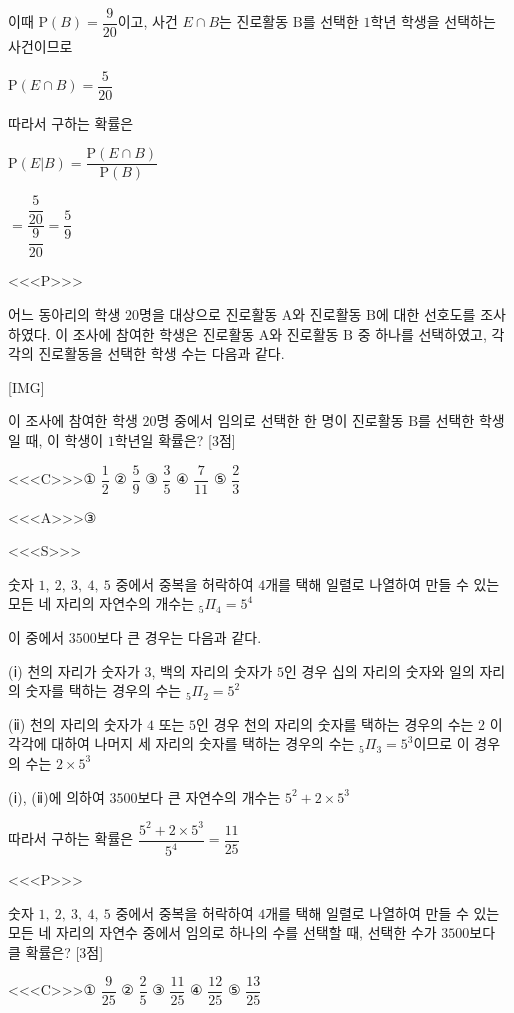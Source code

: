 \documentclass{oblivoir}
\begin{document}
이때 $\mathrm{P}(B)=\dfrac{9}{20}$이고, 사건 $E\cap B$는 진로활동 $\mathrm{B}$를 선택한 $1$학년 학생을 선택하는 사건이므로

$\mathrm{P}(E\cap B)=\dfrac{5}{20}$

따라서 구하는 확률은

$\mathrm{P}(E | B)$$=\dfrac{\mathrm{P}(E\cap B)}{\mathrm{P}(B)}$

$=\dfrac{\dfrac{5}{20}}{\dfrac{9}{20}}=\dfrac{5}{9}$

<<<P>>>

어느 동아리의 학생 $20$명을 대상으로 진로활동 $\mathrm{A}$와 진로활동 $\mathrm{B}$에 대한 선호도를 조사하였다. 이 조사에 참여한 학생은 진로활동 $\mathrm{A}$와 진로활동 $\mathrm{B}$ 중 하나를 선택하였고, 각각의 진로활동을 선택한 학생 수는 다음과 같다.

[IMG]

이 조사에 참여한 학생 $20$명 중에서 임의로 선택한 한 명이 진로활동 $\mathrm{B}$를 선택한 학생일 때, 이 학생이 $1$학년일 확률은? [3점]

<<<C>>>① $\dfrac{1}{2}$ ② $\dfrac{5}{9}$ ③ $\dfrac{3}{5}$ ④ $\dfrac{7}{11}$ ⑤ $\dfrac{2}{3}$

<<<A>>>③

<<<S>>>

숫자 $1,\:2,\:3,\:4,\:5$ 중에서 중복을 허락하여 $4$개를 택해 일렬로 나열하여 만들 수 있는 모든 네 자리의 자연수의 개수는 ${}_{5}\Pi_{4}= 5^{4}$

이 중에서 $3500$보다 큰 경우는 다음과 같다.

(ⅰ) 천의 자리가 숫자가 $3$, 백의 자리의 숫자가 $5$인 경우
십의 자리의 숫자와 일의 자리의 숫자를 택하는 경우의 수는 ${}_{5}\Pi_{2}= 5^{2}$

(ⅱ) 천의 자리의 숫자가 $4$ 또는 $5$인 경우
천의 자리의 숫자를 택하는 경우의 수는 $2$
이 각각에 대하여 나머지 세 자리의 숫자를 택하는 경우의 수는 ${}_{5}\Pi_{3}= 5^{3}$이므로 이 경우의 수는 $2\times 5^{3}$

(ⅰ), (ⅱ)에 의하여 $3500$보다 큰 자연수의 개수는 $5^{2}+ 2\times 5^{3}$

따라서 구하는 확률은 $\dfrac{5^{2}+2\times 5^{3}}{5^{4}}=\dfrac{11}{25}$

<<<P>>>

숫자 $1,\:2,\:3,\:4,\:5$ 중에서 중복을 허락하여 $4$개를 택해 일렬로 나열하여 만들 수 있는 모든 네 자리의 자연수 중에서 임의로 하나의 수를 선택할 때, 선택한 수가 $3500$보다 클 확률은? [3점]

<<<C>>>① $\dfrac{9}{25}$ ② $\dfrac{2}{5}$ ③ $\dfrac{11}{25}$ ④ $\dfrac{12}{25}$ ⑤ $\dfrac{13}{25}$
\end{document}
